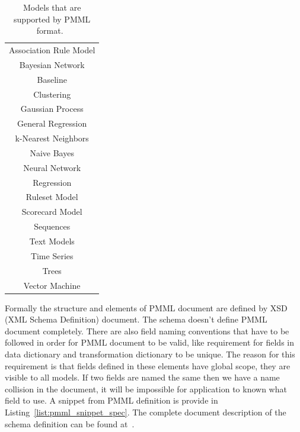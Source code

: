 \documentclass[english, 12pt, a4paper, elec, utf8, online]{aaltothesis}
\begin{document}
\begin{table}[h]
\begin{center}
\caption{Models that are supported by PMML format.~\cite{pmml_spec}}\label{tab:pmml_sup_models}
\begin{tabular}{c}
Association Rule Model \\
Bayesian Network \\
Baseline \\
Clustering \\
Gaussian Process \\
General Regression \\
k-Nearest Neighbors \\
Naive Bayes \\
Neural Network \\
Regression \\
Ruleset Model\\
Scorecard Model\\
Sequences \\
Text Models \\
Time Series \\
Trees \\
Vector Machine
\end{tabular}
\end{center}
\end{table}

Formally the structure and elements of PMML document are defined by XSD (XML Schema Definition) document. The schema doesn't define PMML document completely. There are also field naming conventions that have to be followed in order for PMML document to be valid, like requirement for fields in data dictionary and transformation dictionary to be unique. The reason for this requirement is that fields defined in these elements have global scope, they are visible to all models. If two fields are named the same then we have a name collision in the document, it will be impossible for application to known what field to use. A snippet from PMML definition is provide in Listing~\ref{list:pmml_snippet_spec}. The complete document description of the schema definition can be found at~\cite{pmml_xsd_schema}.
\newpage

\end{document}

